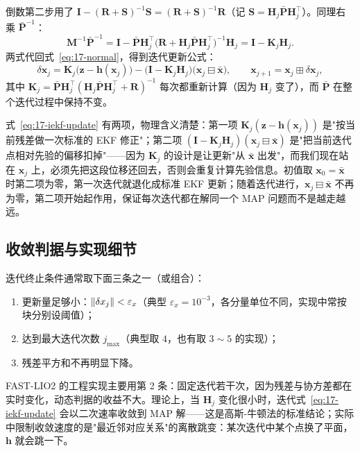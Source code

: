 倒数第二步用了 $\bm{I}-(\bm{R}+\bm{S})^{-1}\bm{S}=(\bm{R}+\bm{S})^{-1}\bm{R}$（记 $\bm{S}=\bm{H}_j\bar{\bm{P}}\bm{H}_j^{\top}$）。同理右乘 $\bar{\bm{P}}^{-1}$：
\begin{equation}
  \bm{M}^{-1}\bar{\bm{P}}^{-1}=\bm{I}-\bar{\bm{P}}\bm{H}_j^{\top}\bigl(\bm{R}+\bm{H}_j\bar{\bm{P}}\bm{H}_j^{\top}\bigr)^{-1}\bm{H}_j=\bm{I}-\bm{K}_j\bm{H}_j.
\end{equation}
两式代回式~\eqref{eq:17-normal}，得到迭代更新公式：
\begin{equation}\label{eq:17-iekf-update}
  \boxed{
  \delta\bm{x}_j=\bm{K}_j\bigl(\bm{z}-\bm{h}(\bm{x}_j)\bigr)-\bigl(\bm{I}-\bm{K}_j\bm{H}_j\bigr)\bigl(\bm{x}_j\boxminus\bar{\bm{x}}\bigr),\qquad
  \bm{x}_{j+1}=\bm{x}_j\boxplus\delta\bm{x}_j,}
\end{equation}
其中 $\bm{K}_j=\bar{\bm{P}}\bm{H}_j^{\top}(\bm{H}_j\bar{\bm{P}}\bm{H}_j^{\top}+\bm{R})^{-1}$ 每次都重新计算（因为 $\bm{H}_j$ 变了），而 $\bar{\bm{P}}$ 在整个迭代过程中保持不变。

式~\eqref{eq:17-iekf-update} 有两项，物理含义清楚：第一项 $\bm{K}_j(\bm{z}-\bm{h}(\bm{x}_j))$ 是"按当前残差做一次标准的 EKF 修正"；第二项 $(\bm{I}-\bm{K}_j\bm{H}_j)(\bm{x}_j\boxminus\bar{\bm{x}})$ 是"把当前迭代点相对先验的偏移扣掉"——因为 $\bm{K}_j$ 的设计是让更新"从 $\bar{\bm{x}}$ 出发"，而我们现在站在 $\bm{x}_j$ 上，必须先把这段位移还回去，否则会重复计算先验信息。初值取 $\bm{x}_0=\bar{\bm{x}}$ 时第二项为零，第一次迭代就退化成标准 EKF 更新；随着迭代进行，$\bm{x}_j\boxminus\bar{\bm{x}}$ 不再为零，第二项开始起作用，保证每次迭代都在解同一个 MAP 问题而不是越走越远。

\subsection{收敛判据与实现细节}

迭代终止条件通常取下面三条之一（或组合）：
\begin{enumerate}
  \item 更新量足够小：$\left\lVert \delta x_j \right\rVert<\varepsilon_x$（典型 $\varepsilon_x=10^{-3}$，各分量单位不同，实现中常按块分别设阈值）；
  \item 达到最大迭代次数 $j_{\max}$（典型取 $4$，也有取 $3\sim5$ 的实现）；
  \item 残差平方和不再明显下降。
\end{enumerate}
FAST-LIO2 的工程实现主要用第 2 条：固定迭代若干次，因为残差与协方差都在实时变化，动态判据的收益不大。理论上，当 $\bm{H}_j$ 变化很小时，迭代式~\eqref{eq:17-iekf-update} 会以二次速率收敛到 MAP 解——这是高斯-牛顿法的标准结论；实际中限制收敛速度的是"最近邻对应关系"的离散跳变：某次迭代中某个点换了平面，$\bm{h}$ 就会跳一下。

